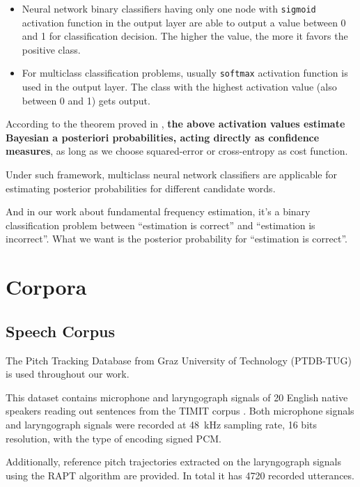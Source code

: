 \documentclass[11pt,a4paper,titlepage]{article}
\begin{document}
\begin{itemize}
  \item Neural network binary classifiers having only one node with \texttt{sigmoid} activation function in the output layer are able to output a value between 0 and 1 for classification decision.
    The higher the value, the more it favors the positive class.
  \item For multiclass classification problems, usually \texttt{softmax} activation function is used in the output layer.
    The class with the highest activation value (also between 0 and 1) gets output.
\end{itemize}

According to the theorem proved in \cite{richard1991neural}, \textbf{the above activation values estimate Bayesian a posteriori probabilities, acting directly as confidence measures}, as long as we choose squared-error or cross-entropy as cost function.

\bigskip

Under such framework, multiclass neural network classifiers are applicable for estimating posterior probabilities for different candidate words.

And in our work about fundamental frequency estimation, it's a binary classification problem between \enquote{estimation is correct} and \enquote{estimation is incorrect}.
What we want is the posterior probability for \enquote{estimation is correct}.

\newpage

\section{Corpora}

\subsection{Speech Corpus}

The Pitch Tracking Database from Graz University of Technology (PTDB-TUG) \cite{pirker2011pitch} is used throughout our work.

This dataset contains microphone and laryngograph signals of 20 English native speakers reading out sentences from the TIMIT corpus \cite{garofolo1993darpa}.
Both microphone signals and laryngograph signals were recorded at \SI{48}{\kilo\hertz} sampling rate, 16 bits resolution, with the type of encoding signed PCM.

Additionally, reference pitch trajectories extracted on the laryngograph signals using the RAPT algorithm \cite{talkin1995robust} are provided.
In total it has 4720 recorded utterances.
\end{document}
